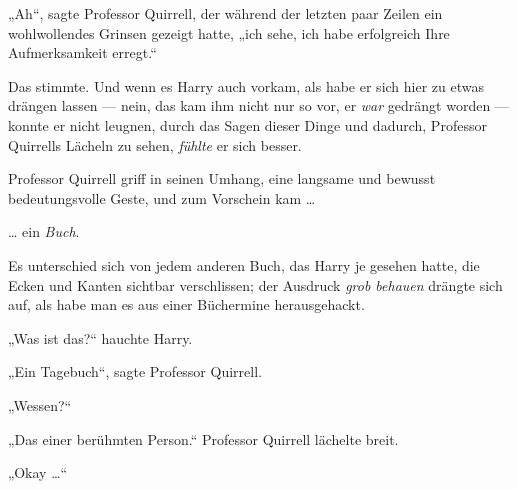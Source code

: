„Ah“, sagte Professor Quirrell, der während der letzten paar Zeilen ein wohlwollendes Grinsen gezeigt hatte, „ich sehe, ich habe erfolgreich Ihre Aufmerksamkeit erregt.“

Das stimmte. Und wenn es Harry auch vorkam, als habe er sich hier zu etwas drängen lassen — nein, das kam ihm nicht nur so vor, er \emph{war} gedrängt worden — konnte er nicht leugnen, durch das Sagen dieser Dinge und dadurch, Professor Quirrells Lächeln zu sehen, \emph{fühlte} er sich besser.

Professor Quirrell griff in seinen Umhang, eine langsame und bewusst bedeutungsvolle Geste, und zum Vorschein kam …

… ein \emph{Buch}.

Es unterschied sich von jedem anderen Buch, das Harry je gesehen hatte, die Ecken und Kanten sichtbar verschlissen; der Ausdruck \emph{grob behauen} drängte sich auf, als habe man es aus einer Büchermine herausgehackt.

„Was ist das?“ hauchte Harry.

„Ein Tagebuch“, sagte Professor Quirrell.

„Wessen?“

„Das einer berühmten Person.“ Professor Quirrell lächelte breit.

„Okay …“

